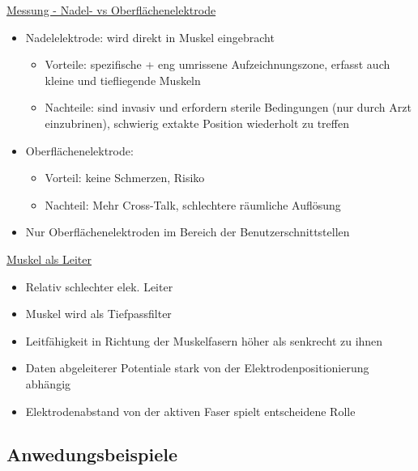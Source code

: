 \documentclass[a4paper,10pt,oneside]{article}
\begin{document}
\underline{Messung - Nadel- vs Oberflächenelektrode} \\
	\begin{itemize}
		\item Nadelelektrode: wird direkt in Muskel eingebracht
			\begin{itemize}
				\item Vorteile: spezifische + eng umrissene Aufzeichnungszone, erfasst auch kleine und tiefliegende Muskeln
				\item Nachteile: sind invasiv und erfordern sterile Bedingungen (nur durch Arzt einzubrinen), schwierig extakte Position wiederholt zu treffen
			\end{itemize}
		\item Oberflächenelektrode: 
			\begin{itemize}
				\item Vorteil: keine Schmerzen, Risiko
				\item Nachteil: Mehr Cross-Talk, schlechtere räumliche Auflösung
			\end{itemize}
		\item Nur Oberflächenelektroden im Bereich der Benutzerschnittstellen
	\end{itemize}
	
\underline{Muskel als Leiter} \\
	\begin{itemize}
		\item Relativ schlechter elek. Leiter
		\item Muskel wird als Tiefpassfilter
		\item Leitfähigkeit in Richtung der Muskelfasern höher als senkrecht zu ihnen
		\item Daten abgeleiterer Potentiale stark von der Elektrodenpositionierung abhängig
		\item Elektrodenabstand von der aktiven Faser spielt entscheidene Rolle
	\end{itemize}
	
\subsection{Anwedungsbeispiele}
\end{document}
